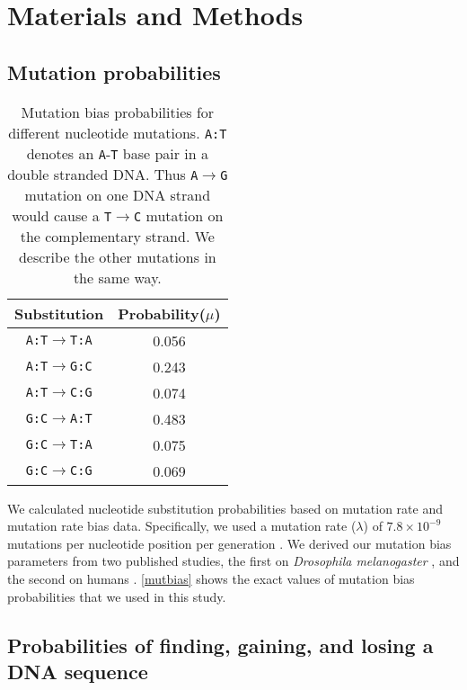 \documentclass[12pt,a4paper]{article}
\begin{document}
\section{Materials and Methods}

\subsection{Mutation probabilities}

\begin{table}[H]
\centering
\begin{tabular}{c c}
\toprule
\textbf{Substitution} & Probability($\mu$) \\\midrule
\texttt{A:T}$\to$\texttt{T:A} & 0.056 \\\midrule
\texttt{A:T}$\to$\texttt{G:C} & 0.243 \\\midrule
\texttt{A:T}$\to$\texttt{C:G} & 0.074 \\\midrule
\texttt{G:C}$\to$\texttt{A:T} & 0.483 \\\midrule
\texttt{G:C}$\to$\texttt{T:A} & 0.075 \\\midrule
\texttt{G:C}$\to$\texttt{C:G} & 0.069 \\\bottomrule
\end{tabular}
\caption{Mutation bias probabilities for different nucleotide mutations. \texttt{A:T} denotes an \texttt{A}-\texttt{T} base pair in a double stranded DNA. Thus \texttt{A}$\to$\texttt{G} mutation on one DNA strand would cause a \texttt{T}$\to$\texttt{C} mutation on the complementary strand. We describe the other mutations in the same way.}
\label{mutbias}
\end{table}

We calculated nucleotide substitution probabilities based on mutation rate and mutation rate bias data. Specifically, we  used a mutation rate ($\lambda$) of $7.8\times10^{-9}$ mutations per nucleotide position per generation \citep{drosophilamutrate}. We derived our mutation bias parameters from two published studies, the first on \textit{Drosophila melanogaster} \citep{drosophilamutrate}, and the second on humans \citep{humanmutrate}. \autoref{mutbias} shows the exact values of mutation bias probabilities that we used in this study.



\subsection{Probabilities of finding, gaining, and losing a DNA sequence}
\label{methbasic}
\end{document}
